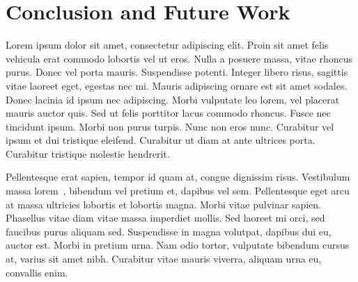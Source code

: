 \documentclass{vitmsprojectreport}
\begin{document}
\chapter{Conclusion and Future Work}

Lorem ipsum dolor sit amet, consectetur adipiscing elit. Proin sit amet felis vehicula erat commodo lobortis vel ut eros. Nulla a posuere massa, vitae rhoncus purus. Donec vel porta mauris. Suspendisse potenti. Integer libero risus, sagittis vitae laoreet eget, egestas nec mi. Mauris adipiscing ornare est sit amet sodales. Donec lacinia id ipsum nec adipiscing. Morbi vulputate leo lorem, vel placerat mauris auctor quis. Sed ut felis porttitor lacus commodo rhoncus. Fusce nec tincidunt ipsum. Morbi non purus turpis. Nunc non eros nunc. Curabitur vel ipsum et dui tristique eleifend. Curabitur ut diam at ante ultrices porta. Curabitur tristique molestie hendrerit.

Pellentesque erat sapien, tempor id quam at, congue dignissim risus. Vestibulum massa lorem~\cite{myers1979the}, bibendum vel pretium et, dapibus vel sem. Pellentesque eget arcu at massa ultricies lobortis et lobortis magna. Morbi vitae pulvinar sapien. Phasellus vitae diam vitae massa imperdiet mollis. Sed laoreet mi orci, sed faucibus purus aliquam sed. Suspendisse in magna volutpat, dapibus dui eu, auctor est. Morbi in pretium urna. Nam odio tortor, vulputate bibendum cursus at, varius sit amet nibh. Curabitur vitae mauris viverra, aliquam urna eu, convallis enim.

\end{document}
